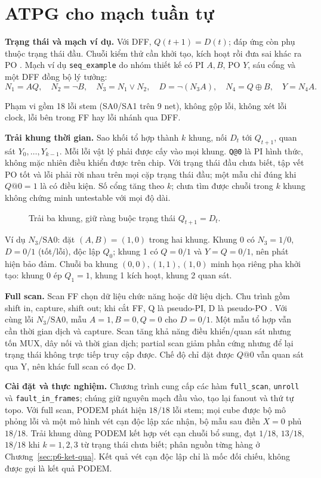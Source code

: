\chapter{ATPG cho mạch tuần tự}
\label{sec:p4-atpg-tuan-tu}
\textbf{Trạng thái và mạch ví dụ.}
Với DFF, $Q(t+1)=D(t)$; đáp ứng còn phụ thuộc trạng thái đầu.
Chuỗi kiểm thử cần khởi tạo, kích hoạt rồi đưa sai khác ra PO
\cite{p4_nptel_seq}. Mạch ví dụ \texttt{seq\_example} do nhóm thiết kế có PI
$A,B$, PO $Y$, sáu cổng và một DFF đồng bộ lý tưởng:
\[
N_1=AQ,\quad N_2=\neg B,\quad N_3=N_1\lor N_2,\quad
D=\neg(N_3A),\quad N_4=Q\oplus B,\quad Y=N_4A.
\]

Phạm vi gồm 18 lỗi stem (SA0/SA1 trên 9 net), không gộp lỗi,
không xét lỗi clock, lỗi bên trong FF hay lỗi nhánh qua DFF.

\textbf{Trải khung thời gian.}
\label{sec:p4-unroll}
Sao khối tổ hợp thành $k$ khung, nối $D_t$ tới $Q_{t+1}$, quan sát
$Y_0,\ldots,Y_{k-1}$. Mỗi lỗi vật lý phải được cấy vào mọi khung.
\texttt{Q@0} là PI hình thức, không mặc nhiên điều khiển được trên chip.
Với trạng thái đầu chưa biết, tập vết PO tốt và lỗi phải rời nhau trên
mọi cặp trạng thái đầu; một mẫu chỉ đúng khi $Q@0=1$ là có điều kiện.
Số cổng tăng theo $k$; chưa tìm được chuỗi trong $k$ khung không chứng minh
untestable với mọi độ dài.
\begin{figure}[htbp]
\centering
\caption{Trải ba khung, giữ ràng buộc trạng thái $Q_{t+1}=D_t$.}
\label{fig:p4-time-frames}
\end{figure}
Ví dụ $N_3/\mathrm{SA0}$: đặt $(A,B)=(1,0)$ trong hai khung.
Khung 0 có $N_3=1/0$, $D=0/1$ (tốt/lỗi), độc lập $Q_0$;
khung 1 có $Q=0/1$ và $Y=Q=0/1$, nên phát hiện bảo đảm.
Chuỗi ba khung $(0,0),(1,1),(1,0)$ minh họa riêng pha khởi tạo:
khung 0 ép $Q_1=1$, khung 1 kích hoạt, khung 2 quan sát.

\textbf{Full scan.}
\label{sec:p4-full-scan}
Scan FF chọn dữ liệu chức năng hoặc dữ liệu dịch. Chu trình gồm shift in,
capture, shift out; khi cắt FF, Q là pseudo-PI, D là pseudo-PO
\cite{p4_eichelberger1977,p4_nptel_scan}.
Với cùng lỗi $N_3/\mathrm{SA0}$, mẫu $A=1,B=0,Q=0$ cho $D=0/1$.
Một mẫu tổ hợp vẫn cần thời gian dịch và capture. Scan tăng khả năng điều
khiển/quan sát nhưng tốn MUX, dây nối và thời gian dịch; partial scan giảm
phần cứng nhưng để lại trạng thái không trực tiếp truy cập được.
Chế độ chỉ đặt được $Q@0$ vẫn quan sát qua Y, nên khác full scan có đọc D.

\textbf{Cài đặt và thực nghiệm.}
\label{sec:p4-thuc-nghiem}
Chương trình cung cấp các hàm \texttt{full\_scan}, \texttt{unroll} và
\texttt{fault\_in\_frames}; chúng giữ nguyên mạch đầu vào, tạo lại fanout và
thứ tự topo. Với full scan, PODEM phát hiện $18/18$ lỗi stem; mọi cube được
bộ mô phỏng lỗi và một mô hình vét cạn độc lập xác nhận, bộ mẫu sau điền
$X=0$ phủ $18/18$. Trải khung dùng PODEM kết hợp vét cạn chuỗi bổ sung,
đạt $1/18$, $13/18$, $18/18$ khi $k=1,2,3$ từ trạng thái chưa biết;
phân nguồn từng hàng ở Chương~\ref{sec:p6-ket-qua}. Kết quả vét cạn độc lập
chỉ là mốc đối chiếu, không được gọi là kết quả PODEM.
